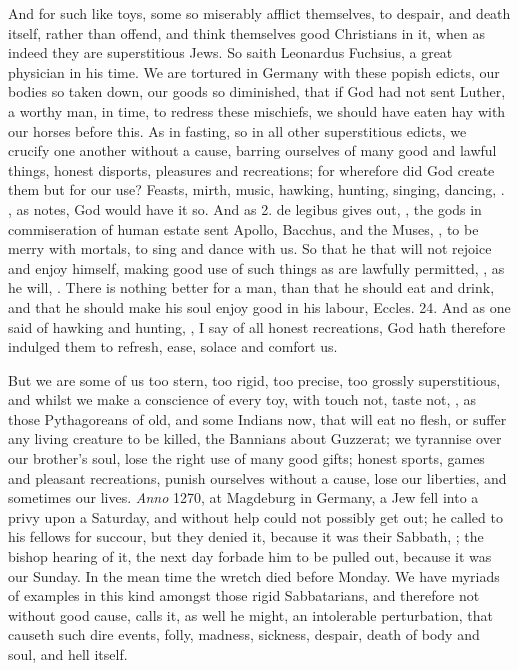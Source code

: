 {And for such like toys, some so miserably afflict themselves, to
despair, and death itself, rather than offend, and think themselves
good Christians in it, when as indeed they are superstitious Jews. So
saith Leonardus Fuchsius, a great physician in his time. We are
tortured in Germany with these popish edicts, our bodies so taken down,
our goods so diminished, that if God had not sent Luther, a worthy man,
in time, to redress these mischiefs, we should have eaten hay with our
horses before this. As in fasting, so in all other superstitious
edicts, we crucify one another without a cause, barring ourselves of
many good and lawful things, honest disports, pleasures and
recreations; for wherefore did God create them but for our use? Feasts,
mirth, music, hawking, hunting, singing, dancing, \etc{}. , as \Seneca
notes, God would have it so. And as \Plato \textlatin{2. de legibus} gives out, , the gods in commiseration of human
estate sent Apollo, Bacchus, and the Muses, , to be merry with mortals, to sing and
dance with us. So that he that will not rejoice and enjoy himself,
making good use of such things as are lawfully permitted, , as he will, . There is nothing better for
a man, than that he should eat and drink, and that he should make his
soul enjoy good in his labour, Eccles.  24. And as one said of
hawking and hunting, , I say of all honest recreations, God
hath therefore indulged them to refresh, ease, solace and comfort us.

But we are some of us too stern, too rigid, too precise, too grossly
superstitious, and whilst we make a conscience of every toy, with touch
not, taste not, \etc{}, as those Pythagoreans of old, and some Indians
now, that will eat no flesh, or suffer any living creature to be
killed, the Bannians about Guzzerat; we tyrannise over our brother's
soul, lose the right use of many good gifts; honest sports, games
and pleasant recreations, punish ourselves without a cause, lose
our liberties, and sometimes our lives. \emph{Anno} 1270, at Magdeburg
in Germany, a Jew fell into a privy upon a Saturday, and without help
could not possibly get out; he called to his fellows for succour, but
they denied it, because it was their Sabbath, ; the bishop hearing of it, the next day forbade him to be
pulled out, because it was our Sunday. In the mean time the wretch died
before Monday. We have myriads of examples in this kind amongst those
rigid Sabbatarians, and therefore not without good cause,
 \Seneca calls it, as well he might, an
intolerable perturbation, that causeth such dire events, folly,
madness, sickness, despair, death of body and soul, and hell itself.

}
